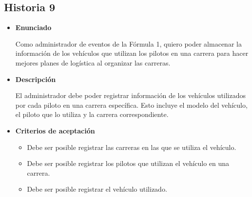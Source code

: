 \documentclass{article}
\begin{document}
	\subsection{Historia 9}
	\begin{itemize}
		
		\item \large{\textbf{Enunciado}}
		\begin{description}
Como administrador de eventos de la Fórmula 1, quiero poder almacenar la información de los vehículos que utilizan los pilotos en una carrera para hacer mejores planes de logística al organizar las carreras.
		\end{description}
		
		\item \large{\textbf{Descripción}}
		\begin{description}
El administrador debe poder registrar información de los vehículos utilizados por cada piloto en una carrera específica. Esto incluye el modelo del vehículo, el piloto que lo utiliza y la carrera correspondiente. 

		\end{description}
		
		\item \large{\textbf{Criterios de aceptación}}
		\begin{itemize}
			\item Debe ser posible registrar las carreras en las que se utiliza el vehículo.
			\item Debe ser posible registrar los pilotos que utilizan el vehículo en una carrera.
			\item Debe ser posible registrar el vehículo utilizado.
			
		\end{itemize}
		
	\end{itemize}
	
\end{document}

